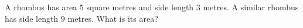 A rhombus has area $5$ square metres and side length $3$ metres. A similar rhombus has side length $9$ metres. What is its area?
